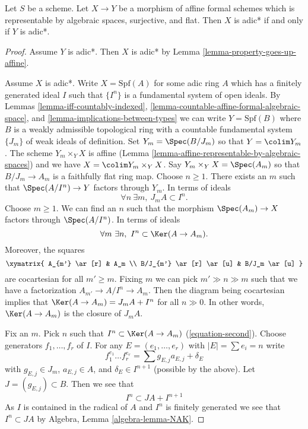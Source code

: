 \begin{lemma}
\label{lemma-iff-adic*}
Let $S$ be a scheme. Let $X \to Y$ be a morphism of affine
formal schemes which is representable by algebraic spaces,
surjective, and flat. Then $X$ is adic* if and only if $Y$ is adic*.
\end{lemma}

\begin{proof}
Assume $Y$ is adic*. Then $X$ is adic* by
Lemma \ref{lemma-property-goes-up-affine}.

\medskip\noindent
Assume $X$ is adic*. Write $X = \text{Spf}(A)$ for some adic ring $A$
which has a finitely generated ideal $I$ such that $\{I^n\}$ is a
fundamental system of open ideals. By
Lemmas \ref{lemma-iff-countably-indexed},
\ref{lemma-countable-affine-formal-algebraic-space}, and
\ref{lemma-implications-between-types}
we can write $Y = \text{Spf}(B)$ where $B$ is a weakly admissible
topological ring with a countable fundamental system $\{J_m\}$ of
weak ideals of definition. Set $Y_m = \Spec(B/J_m)$ so that
$Y = \colim Y_m$. The scheme $Y_m \times_Y X$ is affine
(Lemma \ref{lemma-affine-representable-by-algebraic-spaces})
and we have $X = \colim Y_m \times_Y X$. Say $Y_m \times_Y X = \Spec(A_m)$
so that $B/J_m \to A_m$ is a faithfully flat ring map.
Choose $n \geq 1$. There exists an $m$ such that $\Spec(A/I^n) \to Y$
factors through $Y_m$. In terms of ideals
\begin{equation}
\label{equation-first}
\forall n\ \exists m,\ J_m A \subset I^n.
\end{equation}
Choose $m \geq 1$. We can find an $n$ such that the morphism
$\Spec(A_m) \to X$ factors through $\Spec(A/I^n)$. In terms of ideals
\begin{equation}
\label{equation-second}
\forall m\ \exists n,\ I^n \subset \Ker(A \to A_m).
\end{equation}
Moreover, the squares
$$
\xymatrix{
A_{m'} \ar[r] & A_m \\
B/J_{m'} \ar[r] \ar[u] & B/J_m \ar[u]
}
$$
are cocartesian for all $m' \geq m$. Fixing $m$ we can pick
$m' \gg n \gg m$ such that we have a factorization
$A_{m'} \to A/I^n \to A_m$. Then the diagram being cocartesian
implies that $\Ker(A \to A_m) = J_mA + I^n$ for all $n \gg 0$.
In other words, $\Ker(A \to A_m)$ is the closure of $J_mA$.

\medskip\noindent
Fix an $m$. Pick $n$ such that $I^n \subset \Ker(A \to A_m)$
(\ref{equation-second}). Choose generators $f_1, \ldots, f_r$
of $I$. For any $E = (e_1, \ldots, e_r)$ with $|E| = \sum e_i = n$ write
$$
f_1^{e_1} \ldots f_r^{e_r} =
\sum g_{E, j} a_{E, j} + \delta_E
$$
with $g_{E, j} \in J_m$, $a_{E, j} \in A$, and $\delta_E \in I^{n + 1}$
(possible by the above). Let $J = (g_{E, j}) \subset B$.
Then we see that
$$
I^n \subset J A + I^{n + 1}
$$
As $I$ is contained in the radical of $A$ and $I^n$ is finitely generated
we see that $I^n \subset JA$ by Algebra, Lemma \ref{algebra-lemma-NAK}.


\end{proof}
